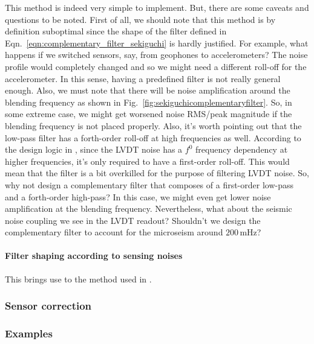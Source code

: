 This method is indeed very simple to implement.
But, there are some caveats and questions to be noted.
First of all, we should note that this method is by definition suboptimal since the shape of the filter defined in Eqn.~\eqref{eqn:complementary_filter_sekiguchi} is hardly justified.
For example, what happens if we switched sensors, say, from geophones to accelerometers?
The noise profile would completely changed and so we might need a different roll-off for the accelerometer.
In this sense, having a predefined filter is not really general enough.
Also, we must note that there will be noise amplification around the blending frequency as shown in Fig.~\ref{fig:sekiguchicomplementaryfilter}.
So, in some extreme case, we might get worsened noise RMS/peak magnitude if the blending frequency is not placed properly.
Also, it's worth pointing out that the low-pass filter has a forth-order roll-off at high frequencies as well.
According to the design logic in \cite{Sekiguchi:2016bmv}, since the LVDT noise has a $f^{0}$ frequency dependency at higher frequencies, it's only required to have a first-order roll-off.
This would mean that the filter is a bit overkilled for the purpose of filtering LVDT noise.
So, why not design a complementary filter that composes of a first-order low-pass and a forth-order high-pass?
In this case, we might even get lower noise amplification at the blending frequency.
Nevertheless, what about the seismic noise coupling we see in the LVDT readout?
Shouldn't we design the complementary filter to account for the microseism around $200\,\mathrm{mHz}$?

\paragraph{Filter shaping according to sensing noises}
This brings use to the method used in \cite{low_frequency_optimization_and_performance_of_advanced_virgo_seismic_isolation_system}.






\subsubsection{Sensor correction \label{sec:sensor_correction}}
\subsubsection{Examples \label{sec:sensor_fusion_examples}}